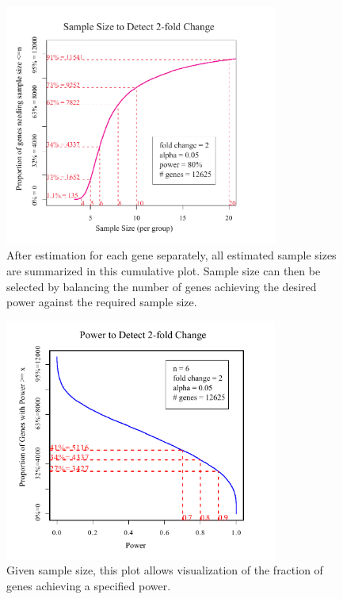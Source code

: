 \documentclass[12pt]{article}
\begin{document}
\begin{figure}%
  \caption[Effect of Sample Size on Power]{
    After estimation for each gene separately, all estimated sample
    sizes are summarized in this cumulative plot. Sample size can then
    be selected by balancing the number of genes achieving the desired
    power against the required sample size.}
  \label{fig:CumNPlot}
  \centerline{\includegraphics*[width=0.8\textwidth]{CumPlotP.pdf}}
\end{figure}

\begin{figure}%
  \caption[Given Sample Size, Fraction of Genes Achieving a Specified Power]{
    Given sample size, this plot allows visualization of the fraction
    of genes achieving a specified power.}
  \label{fig:CumPowerPlot}
  \centerline{\includegraphics*[width=0.8\textwidth]{CumPowerPlotP.pdf}}
\end{figure}
\end{document}
